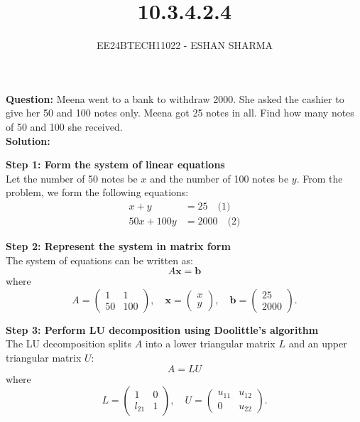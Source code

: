\documentclass[journal]{IEEEtran}
\begin{document}
	
	
	\vspace{3cm}
	\title{10.3.4.2.4}
	\author{EE24BTECH11022 - ESHAN SHARMA}
	{\let\newpage\relax\maketitle}
	
	\renewcommand{\thefigure}{\theenumi}
	\renewcommand{\thetable}{\theenumi}
	\setlength{\intextsep}{10pt} %
	
	
	\renewcommand{\thetable}{\theenumi}
	
	\textbf{Question:}
	Meena went to a bank to withdraw 2000. She asked the cashier to give her 50 and 100 notes only. Meena got 25 notes in all. Find how many notes of 50 and 100 she received.\\
	
	\textbf{Solution:}
	
	\textbf{Step 1: Form the system of linear equations}\\
	Let the number of 50 notes be \(x\) and the number of 100 notes be \(y\). From the problem, we form the following equations:
	\begin{align}
		x + y &= 25 \quad \text{(1)} \\
		50x + 100y &= 2000 \quad \text{(2)}
	\end{align}
	
	\textbf{Step 2: Represent the system in matrix form}\\
	The system of equations can be written as:
	\[
	A \mathbf{x} = \mathbf{b}
	\]
	where
	\[
	A = \begin{pmatrix} 1 & 1 \\ 50 & 100 \end{pmatrix}, \quad \mathbf{x} = \begin{pmatrix} x \\ y \end{pmatrix}, \quad \mathbf{b} = \begin{pmatrix} 25 \\ 2000 \end{pmatrix}.
	\]
	
	\textbf{Step 3: Perform LU decomposition using Doolittle's algorithm}\\
	The LU decomposition splits \(A\) into a lower triangular matrix \(L\) and an upper triangular matrix \(U\):
	\[
	A = LU
	\]
	where
	\[
	L = \begin{pmatrix} 1 & 0 \\ l_{21} & 1 \end{pmatrix}, \quad U = \begin{pmatrix} u_{11} & u_{12} \\ 0 & u_{22} \end{pmatrix}.
	\]
	
\end{document}
